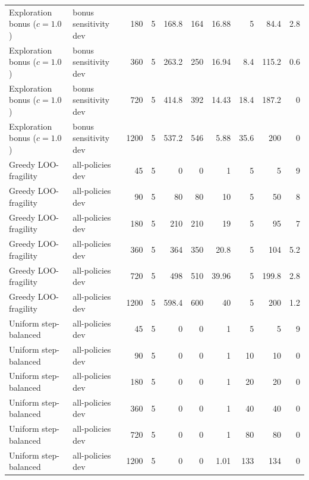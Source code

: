 \begin{landscape}
\begin{scriptsize}
\begin{longtable}{llrrrrrrrr}
Exploration bonus ($c=1.0$) & bonus sensitivity dev & 180 & 5 & 168.8 & 164 & 16.88 & 5 & 84.4 & 2.8 \\
Exploration bonus ($c=1.0$) & bonus sensitivity dev & 360 & 5 & 263.2 & 250 & 16.94 & 8.4 & 115.2 & 0.6 \\
Exploration bonus ($c=1.0$) & bonus sensitivity dev & 720 & 5 & 414.8 & 392 & 14.43 & 18.4 & 187.2 & 0 \\
Exploration bonus ($c=1.0$) & bonus sensitivity dev & 1200 & 5 & 537.2 & 546 & 5.88 & 35.6 & 200 & 0 \\
Greedy LOO-fragility & all-policies dev & 45 & 5 & 0 & 0 & 1 & 5 & 5 & 9 \\
Greedy LOO-fragility & all-policies dev & 90 & 5 & 80 & 80 & 10 & 5 & 50 & 8 \\
Greedy LOO-fragility & all-policies dev & 180 & 5 & 210 & 210 & 19 & 5 & 95 & 7 \\
Greedy LOO-fragility & all-policies dev & 360 & 5 & 364 & 350 & 20.8 & 5 & 104 & 5.2 \\
Greedy LOO-fragility & all-policies dev & 720 & 5 & 498 & 510 & 39.96 & 5 & 199.8 & 2.8 \\
Greedy LOO-fragility & all-policies dev & 1200 & 5 & 598.4 & 600 & 40 & 5 & 200 & 1.2 \\
Uniform step-balanced & all-policies dev & 45 & 5 & 0 & 0 & 1 & 5 & 5 & 9 \\
Uniform step-balanced & all-policies dev & 90 & 5 & 0 & 0 & 1 & 10 & 10 & 0 \\
Uniform step-balanced & all-policies dev & 180 & 5 & 0 & 0 & 1 & 20 & 20 & 0 \\
Uniform step-balanced & all-policies dev & 360 & 5 & 0 & 0 & 1 & 40 & 40 & 0 \\
Uniform step-balanced & all-policies dev & 720 & 5 & 0 & 0 & 1 & 80 & 80 & 0 \\
Uniform step-balanced & all-policies dev & 1200 & 5 & 0 & 0 & 1.01 & 133 & 134 & 0 \\
\bottomrule
\end{longtable}
\end{scriptsize}
\end{landscape}
